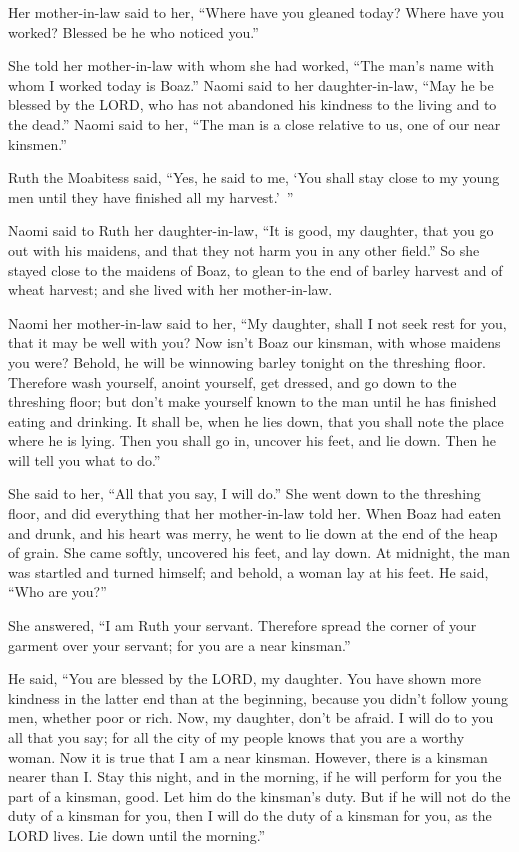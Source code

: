 \myverse{}Her mother-in-law said to her, “Where have you gleaned today?
Where have you worked? Blessed be he who noticed you.”

She told her mother-in-law with whom she had worked, “The man’s name with whom I worked today
is Boaz.”
\myverse{}Naomi said to her daughter-in-law, “May he be blessed by the LORD, who has
not abandoned his kindness to the living and to the dead.” Naomi said to her, “The man is a close relative
to us, one of our near kinsmen.”

\myverse{}Ruth the Moabitess said, “Yes, he said to me, ‘You shall stay
close to my young men until they have finished all my harvest.’ ”

\myverse{}Naomi said to Ruth her daughter-in-law, “It is good, my daughter,
that you go out with his maidens, and that they not harm you in any other field.”
\myverse{}So she stayed close to the maidens of Boaz, to glean to the end of barley
harvest and of wheat harvest; and she lived with her mother-in-law.


\mychapter{} \myverse*{}Naomi her mother-in-law said to her, “My daughter, shall I not
seek rest for you, that it may be well with you?
\myverse{}Now isn’t Boaz our kinsman, with whose maidens you were? Behold, he will be
winnowing barley tonight on the threshing floor.
\myverse{}Therefore wash yourself, anoint yourself, get dressed, and go down to the threshing
floor; but don’t make yourself known to the man until he has finished eating and drinking.
\myverse{}It shall be, when he lies down, that you shall note the place where he is lying.
Then you shall go in, uncover his feet, and lie down. Then he will tell you what to do.”

\myverse{}She said to her, “All that you say, I will do.”
\myverse{}She went down to the threshing floor, and did everything that her mother-in-law
told her.
\myverse{}When Boaz had eaten and drunk, and his heart was merry, he went to lie down
at the end of the heap of grain. She came softly, uncovered his feet, and lay down.
\myverse{}At midnight, the man was startled and turned himself; and behold, a woman lay
at his feet.
\myverse{}He said, “Who are you?”

She answered, “I am Ruth your servant. Therefore spread the corner of your garment over your
servant; for you are a near kinsman.”

\myverse{}He said, “You are blessed by the LORD, my daughter. You have
shown more kindness in the latter end than at the beginning, because you didn’t follow young men, whether
poor or rich.
\myverse{}Now, my daughter, don’t be afraid. I will do to you all that you say; for
all the city of my people knows that you are a worthy woman.
\myverse{}Now it is true that I am a near kinsman. However, there is a kinsman nearer
than I.
\myverse{}Stay this night, and in the morning, if he will perform for you the part of
a kinsman, good. Let him do the kinsman’s duty. But if he will not do the duty of a kinsman for you, then
I will do the duty of a kinsman for you, as the LORD lives. Lie down until the morning.”


